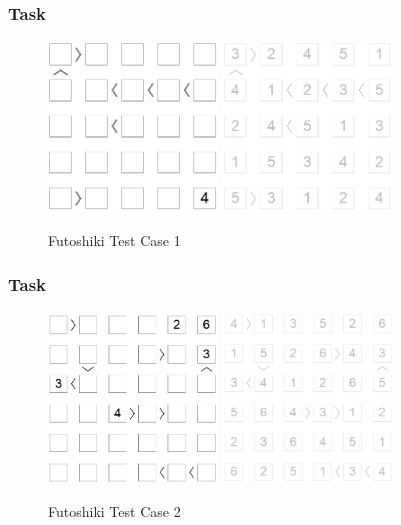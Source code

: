 \documentclass{beamer}
\begin{document}
\begin{frame}    \frametitle{Task}

    \begin{figure}[htbp]
    \centering
    \includegraphics[width=4.5cm]{Pic/f1}
    \qquad
    \includegraphics[width=4.5cm]{Pic/f1s}
    \caption{Futoshiki Test Case 1}
    \label{fig:case11}
  \end{figure}
\end{frame}
\begin{frame}    \frametitle{Task}
        \begin{figure}[htbp]
    \centering
    \includegraphics[width=4.5cm]{Pic/f2}
    \qquad
    \includegraphics[width=4.5cm]{Pic/f2s}
    \caption{Futoshiki Test Case 2}
    \label{fig:case22}
  \end{figure}
\end{frame}
\end{document}
